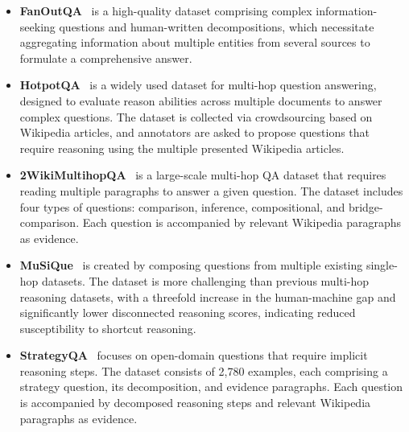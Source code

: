 \begin{itemize}
    \item \textbf{FanOutQA}~\cite{zhu2024fanoutqa} is a high-quality dataset comprising complex information-seeking questions and human-written decompositions, which necessitate aggregating information about multiple entities from several sources to formulate a comprehensive answer. 

    \item \textbf{HotpotQA}~\cite{yang2018hotpotqa} is a widely used dataset for multi-hop question answering, designed to evaluate reason abilities across multiple documents to answer complex questions. The dataset is collected via crowdsourcing based on Wikipedia articles, and annotators are asked to propose questions that require reasoning using the multiple presented Wikipedia articles.

    \item \textbf{2WikiMultihopQA}~\cite{ho2020constructing} is a large-scale multi-hop QA dataset that requires reading multiple paragraphs to answer a given question. The dataset includes four types of questions: comparison, inference, compositional, and bridge-comparison. Each question is accompanied by relevant Wikipedia paragraphs as evidence.
    
    \item \textbf{MuSiQue}~\cite{trivedi2022musique} is created by composing questions from multiple existing single-hop datasets. The dataset is more challenging than previous multi-hop reasoning datasets, with a threefold increase in the human-machine gap and significantly lower disconnected reasoning scores, indicating reduced susceptibility to shortcut reasoning.
    
    \item \textbf{StrategyQA}~\cite{geva2021did} focuses on open-domain questions that require implicit reasoning steps. The dataset consists of 2,780 examples, each comprising a strategy question, its decomposition, and evidence paragraphs. Each question is accompanied by decomposed reasoning steps and relevant Wikipedia paragraphs as evidence.


    
\end{itemize}



